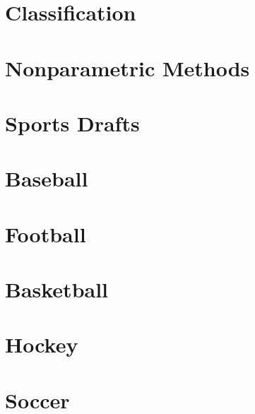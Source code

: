 \documentclass[
  11pt,
]{book}
\theoremstyle{definition}
\theoremstyle{definition}
\theoremstyle{definition}
\theoremstyle{definition}
\theoremstyle{remark}
\begin{document}
\hypertarget{classification}{%
\chapter{Classification}\label{classification}}

\hypertarget{nonparametric-methods}{%
\chapter{Nonparametric Methods}\label{nonparametric-methods}}

\hypertarget{sports-drafts}{%
\chapter{Sports Drafts}\label{sports-drafts}}

\hypertarget{baseball-1}{%
\chapter{Baseball}\label{baseball-1}}

\hypertarget{football-1}{%
\chapter{Football}\label{football-1}}

\hypertarget{basketball-1}{%
\chapter{Basketball}\label{basketball-1}}

\hypertarget{hockey-1}{%
\chapter{Hockey}\label{hockey-1}}

\hypertarget{soccer-1}{%
\chapter{Soccer}\label{soccer-1}}

  
\end{document}
